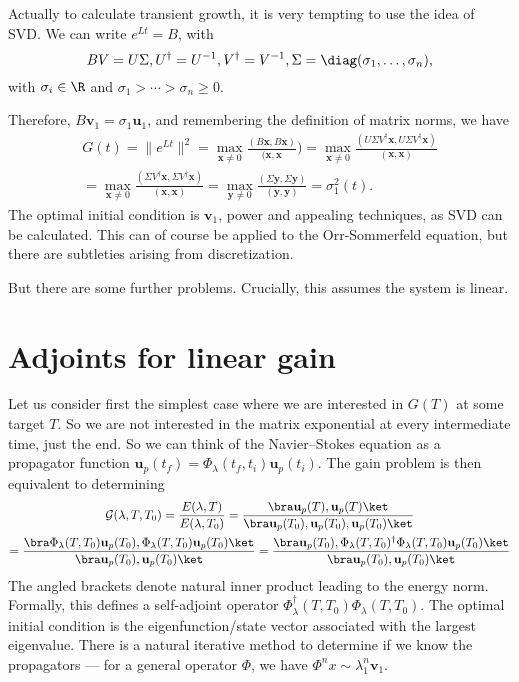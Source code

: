 \documentclass[a4paper]{article}
\begin{document}
Actually to calculate transient growth, it is very tempting to use the idea of SVD. We can write $e^{Lt} = B$, with
\[
  BV = U\Sigma, U^\dagger = U^{-1}, V^\dagger = V^{-1}, \Sigma = \diag(\sigma_1, \ldots, \sigma_n),
\]
with $\sigma_i \in \R$ and $\sigma_1 > \cdots > \sigma_n \geq 0$.

Therefore, $B\mathbf{v}_1 = \sigma_1 \mathbf{u}_1$, and remembering the definition of matrix norms, we have
\begin{multline*}
  G(t) =\|e^{Lt}\|^2 = \max_{\mathbf{x} \not= 0} \frac{(B\mathbf{x}, B\mathbf{x})}{(\mathbf{x}, \mathbf{x}}) = \max_{\mathbf{x} \not= 0} \frac{(U\Sigma V^\dagger \mathbf{x}, U\Sigma V^\dagger \mathbf{x})}{(\mathbf{x}, \mathbf{x})}\\
  = \max_{\mathbf{x} \not= 0} \frac{(\Sigma V^\dagger \mathbf{x}, \Sigma V^\dagger \mathbf{x})}{(\mathbf{x}, \mathbf{x})} = \max_{\mathbf{y} \not= 0} \frac{(\Sigma \mathbf{y}, \Sigma \mathbf{y})}{(\mathbf{y}, \mathbf{y})} = \sigma_1^2(t).
\end{multline*}
The optimal initial condition is $\mathbf{v}_1$, power and appealing techniques, as SVD can be calculated. This can of course be applied to the Orr-Sommerfeld equation, but there are subtleties arising from discretization.

But there are some further problems. Crucially, this assumes the system is linear.

\section{Adjoints for linear gain}
Let us consider first the simplest case where we are interested in $G(T)$ at some target $T$. So we are not interested in the matrix exponential at every intermediate time, just the end. So we can think of the Navier--Stokes equation as a propagator function $\mathbf{u}_p(t_f) = \Phi_\lambda(t_f, t_i) \mathbf{u}_p(t_i)$. The gain problem is then equivalent to determining
\begin{multline*}
  \mathcal{G}(\lambda, T, T_0) = \frac{E(\lambda, T)}{ E(\lambda, T_0)} = \frac{\bra \mathbf{u}_p(T), \mathbf{u}_p(T)\ket}{ \bra \mathbf{u}_p(T_0), \mathbf{u}_p(T_0), \mathbf{u}_p(T_0)\ket}\\
  = \frac{\bra \Phi_\lambda (T, T_0) \mathbf{u}_p(T_0), \Phi_\lambda(T, T_0) \mathbf{u}_p(T_0)\ket}{\bra \mathbf{u}_p(T_0), \mathbf{u}_p(T_0)\ket} = \frac{\bra \mathbf{u}_p(T_0), \Phi_\lambda (T, T_0)^\dagger \Phi_\lambda(T, T_0) \mathbf{u}_p(T_0)\ket}{\bra \mathbf{u}_p(T_0), \mathbf{u}_p(T_0)\ket}
\end{multline*}
The angled brackets denote natural inner product leading to the energy norm. Formally, this defines a self-adjoint operator $\Phi_\lambda^\dagger (T, T_0) \Phi_\lambda(T, T_0)$. The optimal initial condition is the eigenfunction/state vector associated with the largest eigenvalue. There is a natural iterative method to determine if we know the propagators --- for a general operator $\Phi$, we have $\Phi^n x \sim \lambda_1^n \mathbf{v}_1$.
\end{document}
